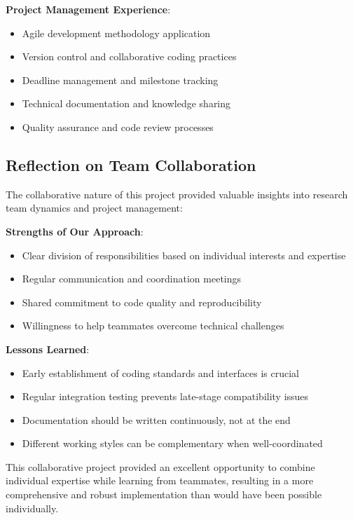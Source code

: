 \textbf{Project Management Experience}:
\begin{itemize}
    \item Agile development methodology application
    \item Version control and collaborative coding practices
    \item Deadline management and milestone tracking
    \item Technical documentation and knowledge sharing
    \item Quality assurance and code review processes
\end{itemize}

\subsection{Reflection on Team Collaboration}

The collaborative nature of this project provided valuable insights into research team dynamics and project management:

\textbf{Strengths of Our Approach}:
\begin{itemize}
    \item Clear division of responsibilities based on individual interests and expertise
    \item Regular communication and coordination meetings
    \item Shared commitment to code quality and reproducibility
    \item Willingness to help teammates overcome technical challenges
\end{itemize}

\textbf{Lessons Learned}:
\begin{itemize}
    \item Early establishment of coding standards and interfaces is crucial
    \item Regular integration testing prevents late-stage compatibility issues
    \item Documentation should be written continuously, not at the end
    \item Different working styles can be complementary when well-coordinated
\end{itemize}

This collaborative project provided an excellent opportunity to combine individual expertise while learning from teammates, resulting in a more comprehensive and robust implementation than would have been possible individually.
